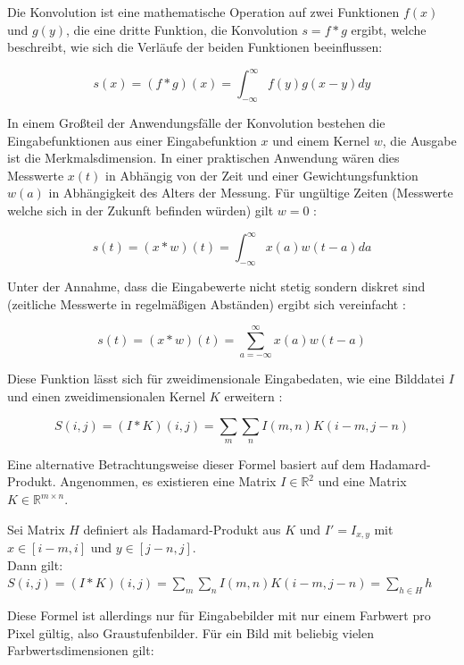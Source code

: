 \bigskip

Die Konvolution ist eine mathematische Operation auf zwei Funktionen $f(x)$ und $g(y)$, die eine dritte Funktion, die Konvolution $s = f*g$ ergibt, welche beschreibt, wie sich die Verläufe der beiden Funktionen beeinflussen:

\begin{equation}
s(x) = (f*g)(x) = \int_{-\infty}^{\infty} f(y)g(x-y)dy
\end{equation}

In einem Großteil der Anwendungsfälle der Konvolution bestehen die Eingabefunktionen aus einer Eingabefunktion $x$ und einem Kernel $w$, die Ausgabe ist die Merkmalsdimension. In einer praktischen Anwendung wären dies \bspw Messwerte $x(t)$ in Abhängig von der Zeit und einer Gewichtungsfunktion $w(a)$ in Abhängigkeit des Alters der Messung. Für ungültige Zeiten (\bspw Messwerte welche sich in der Zukunft befinden würden) gilt $w=0$ \cite[Kap.~9]{deeplearning_16}:

\begin{equation}
s(t) = (x*w)(t) = \int_{-\infty}^{\infty} x(a)w(t-a)da
\end{equation}

Unter der Annahme, dass die Eingabewerte nicht stetig sondern diskret sind (\bspw zeitliche Messwerte in regelmäßigen Abständen) ergibt sich vereinfacht \cite[Kap.~9]{deeplearning_16}:

\begin{equation}
s(t) = (x*w)(t) = \sum_{a=-\infty}^{\infty}x(a)w(t-a)
\end{equation}

Diese Funktion lässt sich für zweidimensionale Eingabedaten, wie \zB eine Bilddatei $I$ und einen zweidimensionalen Kernel $K$ erweitern \cite[Kap.~9]{deeplearning_16}:

\begin{equation}
S(i,j) = (I*K)(i,j) = \sum_{m}\sum_{n}I(m,n)K(i-m,j-n)
\end{equation}

Eine alternative Betrachtungsweise dieser Formel basiert auf dem Hadamard-Produkt. Angenommen, es existieren eine Matrix $I\in\mathbb{R}^{2}$ und eine Matrix $K\in\mathbb{R}^{m\times n}$.

Sei Matrix $H$ definiert als Hadamard-Produkt aus $K$ und $I'=I_{x, y}$ mit $x\in[i-m,i]$ und $y\in[j-n,j]$.\\
Dann gilt: $S(i,j)=(I*K)(i,j) = \sum_{m}\sum_{n}I(m,n)K(i-m,j-n)=\sum_{h\in H}h$

Diese Formel ist allerdings nur für Eingabebilder mit nur einem Farbwert pro Pixel gültig, also Graustufenbilder. Für ein Bild mit beliebig vielen Farbwertsdimensionen gilt:

